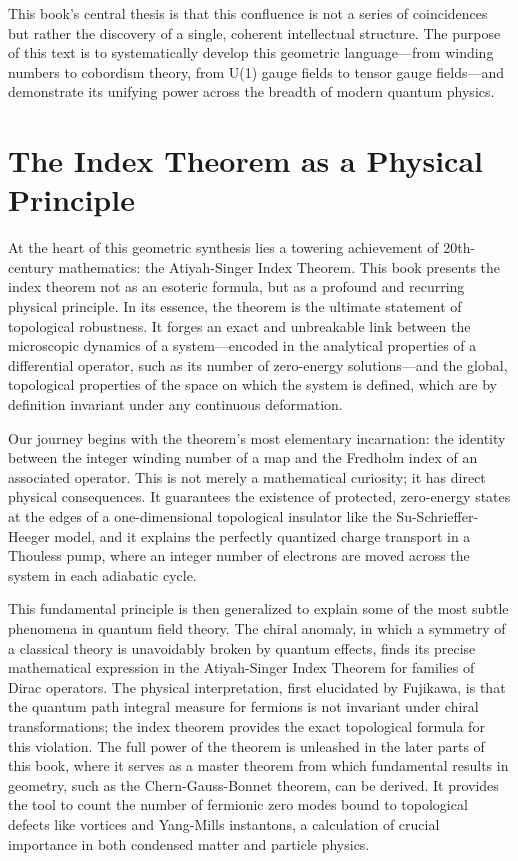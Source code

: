 This book's central thesis is that this confluence is not a series of coincidences but rather the discovery of a single, coherent intellectual structure. The purpose of this text is to systematically develop this geometric language---from winding numbers to cobordism theory, from U(1) gauge fields to tensor gauge fields---and demonstrate its unifying power across the breadth of modern quantum physics.

\section{The Index Theorem as a Physical Principle}

At the heart of this geometric synthesis lies a towering achievement of 20th-century mathematics: the Atiyah-Singer Index Theorem. This book presents the index theorem not as an esoteric formula, but as a profound and recurring physical principle. In its essence, the theorem is the ultimate statement of topological robustness. It forges an exact and unbreakable link between the microscopic dynamics of a system---encoded in the analytical properties of a differential operator, such as its number of zero-energy solutions---and the global, topological properties of the space on which the system is defined, which are by definition invariant under any continuous deformation.

Our journey begins with the theorem's most elementary incarnation: the identity between the integer winding number of a map and the Fredholm index of an associated operator. This is not merely a mathematical curiosity; it has direct physical consequences. It guarantees the existence of protected, zero-energy states at the edges of a one-dimensional topological insulator like the Su-Schrieffer-Heeger model, and it explains the perfectly quantized charge transport in a Thouless pump, where an integer number of electrons are moved across the system in each adiabatic cycle.

This fundamental principle is then generalized to explain some of the most subtle phenomena in quantum field theory. The chiral anomaly, in which a symmetry of a classical theory is unavoidably broken by quantum effects, finds its precise mathematical expression in the Atiyah-Singer Index Theorem for families of Dirac operators. The physical interpretation, first elucidated by Fujikawa, is that the quantum path integral measure for fermions is not invariant under chiral transformations; the index theorem provides the exact topological formula for this violation. The full power of the theorem is unleashed in the later parts of this book, where it serves as a master theorem from which fundamental results in geometry, such as the Chern-Gauss-Bonnet theorem, can be derived. It provides the tool to count the number of fermionic zero modes bound to topological defects like vortices and Yang-Mills instantons, a calculation of crucial importance in both condensed matter and particle physics.

